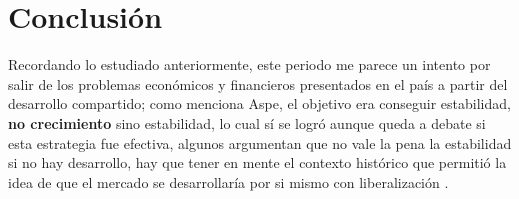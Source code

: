 \section{Conclusión}
Recordando lo estudiado anteriormente, este periodo me parece un intento por salir de los problemas económicos y financieros presentados en el país a partir del desarrollo compartido; como menciona Aspe, el objetivo era conseguir estabilidad, \textbf{no crecimiento} sino estabilidad, lo cual sí se logró aunque queda a debate si esta estrategia fue efectiva, algunos argumentan que no vale la pena la estabilidad si no hay desarrollo, hay que tener en mente el contexto histórico que permitió la idea de que el mercado se desarrollaría por si mismo con liberalización \cite{AjusteMacroAspe}.